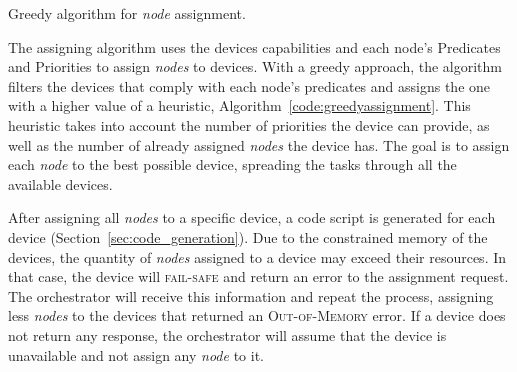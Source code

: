 \begin{algorithm}
\BlankLine
{}
\BlankLine
{}
\caption{Greedy algorithm for \textit{node} assignment.}
\label{code:greedyassignment}
\end{algorithm}

The assigning algorithm uses the devices capabilities and each node's Predicates and Priorities to assign \textit{nodes} to devices. With a greedy approach, the algorithm filters the devices that comply with each node's predicates and assigns the one with a higher value of a heuristic, \cf Algorithm~\ref{code:greedyassignment}. This heuristic takes into account the number of priorities the device can provide, as well as the number of already assigned \textit{nodes} the device has. The goal is to assign each \textit{node} to the best possible device, spreading the tasks through all the available devices.

After assigning all \textit{nodes} to a specific device, a code script is generated for each device (\cf Section~\ref{sec:code_generation}). Due to the constrained memory of the devices, the quantity of \textit{nodes} assigned to a device may exceed their resources. In that case, the device will \textsc{fail-safe} and return an error to the assignment request. The orchestrator will receive this information and repeat the process, assigning less \textit{nodes} to the devices that returned an \textsc{Out-of-Memory} error. If a device does not return any response, the orchestrator will assume that the device is unavailable and not assign any \textit{node} to it.

